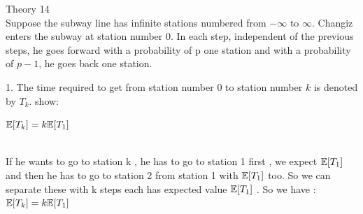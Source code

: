 \documentclass[30pt]{article}
\begin{document}
{\Large \color{blue} Theory 14 } \\
{\color{blue} Suppose the subway line has infinite stations numbered from $-\infty$ to $\infty$. Changiz enters the subway at station number 0. In each step, independent of the previous steps, he goes forward with a probability of p one station and with a probability of $p − 1$, he goes back one station. } \\ \newline 
{\color{blue} {\large 1. }The time required to get from station number $0$ to station number $k$ is denoted by $T_k$. show: \\ 
\begin{center}
    $\Bbb{E}[T_k] = k \Bbb{E}[T_1] $
\end{center} } \\ \newline
If he wants to go to station k , he has to go to station 1 first , we expect $\Bbb{E}[T_1]$ and then he has to go to station 2 from station 1 with $\Bbb{E}[T_1]$ too. So we can separate these with k steps each has expected value $\Bbb{E}[T_1]$ . So we have : \hspace{0.3cm} $\Bbb{E}[T_k] = k \Bbb{E}[T_1] $ \\ 
\end{document}
